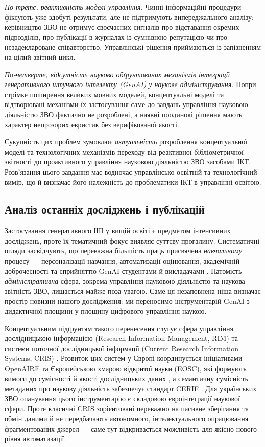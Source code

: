 \textit{По-третє, реактивність моделі управління.} Чинні інформаційні процедури фіксують уже здобуті результати, але не підтримують випереджального аналізу: керівництво ЗВО не отримує своєчасних сигналів про відставання окремих підрозділів, про публікації в журналах із сумнівною репутацією чи про незадеклароване співавторство. Управлінські рішення приймаються із запізненням на цілий звітний цикл.

\textit{По-четверте, відсутність науково обґрунтованих механізмів інтеграції генеративного штучного інтелекту (GenAI) у наукове адміністрування.} Попри стрімке поширення великих мовних моделей, концептуальні моделі та відтворювані механізми їх застосування саме до завдань управління науковою діяльністю ЗВО фактично не розроблені, а наявні поодинокі рішення мають характер непрозорих евристик без верифікованої якості.

Сукупність цих проблем зумовлює \textit{актуальність} розроблення концептуальної моделі та технологічних механізмів переходу від реактивної бібліометричної звітності до проактивного управління науковою діяльністю ЗВО засобами ІКТ. Розв'язання цього завдання має водночас управлінсько-освітній та технологічний вимір, що й визначає його належність до проблематики ІКТ в управлінні освітою.

\subsection*{Аналіз останніх досліджень і публікацій}

Застосування генеративного ШІ у вищій освіті є предметом інтенсивних досліджень, проте їх тематичний фокус виявляє суттєву прогалину. Систематичні огляди засвідчують, що переважна більшість праць присвячена \textit{навчальному} процесу --- персоналізації навчання, автоматизації оцінювання, академічній доброчесності та сприйняттю GenAI студентами й викладачами \cite{Tillmanns2025SystematicReviewGenAIHE,Alshamy2025PerceptionsGenAIHE}. Натомість \textit{адміністративна} сфера, зокрема управління науковою діяльністю та наукова звітність ЗВО, лишається майже поза увагою. Саме ця незаповнена ніша визначає простір новизни нашого дослідження: ми переносимо інструментарій GenAI з дидактичної площини у площину цифрового управління наукою.

Концептуальним підґрунтям такого перенесення слугує сфера управління дослідницькою інформацією (Research Information Management, RIM) та системи поточної дослідницької інформації (Current Research Information Systems, CRIS) \cite{Bryant2017RIMDefining}. Розвиток цих систем у Європі координується ініціативами OpenAIRE та Європейською хмарою відкритої науки (EOSC), які формують вимоги до сумісності й якості дослідницьких даних \cite{OpenAIRE2023GuidelinesCRIS}, а семантичну сумісність метаданих про наукову діяльність забезпечує стандарт CERIF \cite{euroCRIS2024CERIF}. Для українських ЗВО опанування цього інструментарію є складовою євроінтеграції наукової сфери. Проте класичні CRIS зорієнтовані переважно на пасивне зберігання та обмін даними й не передбачають автономного, інтелектуального опрацювання фрагментованих джерел --- саме тут відкривається можливість для якісно нового рівня автоматизації.


